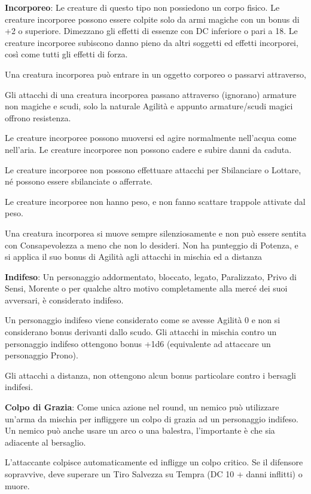 \documentclass[a4paper,11pt,twoside,openany]{book}
\begin{document}
\textbf{Incorporeo}: Le creature di questo tipo non possiedono un corpo fisico. Le creature incorporee possono essere colpite solo da armi magiche con un bonus di +2 o superiore. Dimezzano gli effetti di essenze con DC inferiore o pari a 18. Le creature incorporee subiscono danno pieno da altri soggetti ed effetti incorporei, così come tutti gli effetti di forza.

Una creatura incorporea può entrare in un oggetto corporeo o passarvi attraverso,

Gli attacchi di una creatura incorporea passano attraverso (ignorano) armature non magiche e scudi, solo la naturale Agilità e appunto armature/scudi magici offrono resistenza.

Le creature incorporee possono muoversi ed agire normalmente nell'acqua come nell'aria. Le creature incorporee non possono cadere e subire danni da caduta.

Le creature incorporee non possono effettuare attacchi per Sbilanciare o Lottare, né possono essere sbilanciate o afferrate.

Le creature incorporee non hanno peso, e non fanno scattare trappole attivate dal peso.

Una creatura incorporea si muove sempre silenziosamente e non può essere sentita con Consapevolezza a meno che non lo desideri. Non ha punteggio di Potenza, e si applica il suo bonus di Agilità agli attacchi in mischia ed a distanza

\textbf{Indifeso}: Un personaggio addormentato, bloccato, legato, Paralizzato, Privo di Sensi, Morente o per qualche altro motivo completamente alla mercé dei suoi avversari, è considerato indifeso.

Un personaggio indifeso viene considerato come se avesse Agilità 0 e non si considerano bonus derivanti dallo scudo. Gli attacchi in mischia contro un personaggio indifeso ottengono bonus +1d6 (equivalente ad attaccare un personaggio Prono).

Gli attacchi a distanza, non ottengono alcun bonus particolare contro i bersagli indifesi.

\textbf{Colpo di Grazia}: Come unica azione nel round, un nemico può utilizzare un'arma da mischia per infliggere un colpo di grazia ad un personaggio indifeso. Un nemico può anche usare un arco o una balestra, l'importante è che sia adiacente al bersaglio.

L'attaccante colpisce automaticamente ed infligge un colpo critico. Se il difensore sopravvive, deve superare un Tiro Salvezza su Tempra (DC 10 + danni inflitti) o muore.
\end{document}
